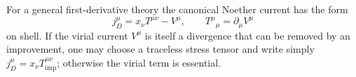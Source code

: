 \begin{enumerate}
\begin{enumerate}
For a general first-derivative theory the canonical Noether current has the
form
\[
 j_D^\mu=x_\nu T^{\mu\nu}-V^\mu,
\qquad
 {T^\mu}_\mu=\partial_\mu V^\mu
\]
on shell.  If the virial current \(V^\mu\) is itself a divergence that can
be removed by an improvement, one may choose a traceless stress tensor and
write simply \(j_D^\mu=x_\nu T_{\mathrm{imp}}^{\mu\nu}\); otherwise the
virial term is essential.
\end{enumerate}
\end{enumerate}
